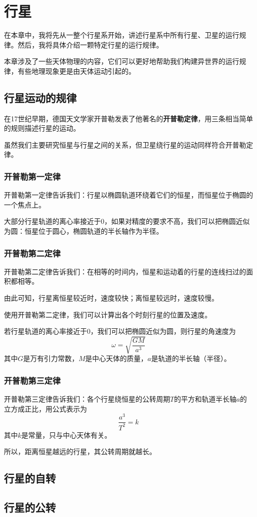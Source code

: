 \chapter{行星}
在本章中，我将先从一整个行星系开始，讲述行星系中所有行星、卫星的运行规律。然后，我将具体介绍一颗特定行星的运行规律。

本章涉及了一些天体物理的内容，它们可以更好地帮助我们构建异世界的运行规律，有些地理现象更是由天体运动引起的。

\section{行星运动的规律}
在17世纪早期，德国天文学家开普勒发表了他著名的\textbf{开普勒定律}，用三条相当简单的规则描述行星的运动。

虽然我们主要研究恒星与行星之间的关系，但卫星绕行星的运动同样符合开普勒定律。

\subsection{开普勒第一定律}
开普勒第一定律告诉我们：行星以椭圆轨道环绕着它们的恒星，而恒星位于椭圆的一个焦点上。

大部分行星轨道的离心率接近于0，如果对精度的要求不高，我们可以把椭圆近似为圆：恒星位于圆心，椭圆轨道的半长轴作为半径。

\subsection{开普勒第二定律}
开普勒第二定律告诉我们：在相等的时间内，恒星和运动着的行星的连线扫过的面积都相等。

由此可知，行星离恒星较近时，速度较快；离恒星较远时，速度较慢。

使用开普勒第二定律，我们可以计算出各个时刻行星的位置及速度。

若行星轨道的离心率接近于0，我们可以把椭圆近似为圆，则行星的角速度为\[\omega=\sqrt{\frac{GM}{a^3}}\]其中$G$是万有引力常数，$M$是中心天体的质量，$a$是轨道的半长轴（半径）。

\subsection{开普勒第三定律}
开普勒第三定律告诉我们：各个行星绕恒星的公转周期$T$的平方和轨道半长轴$a$的立方成正比，用公式表示为\[\frac{a^3}{T^2}=k\]其中$k$是常量，只与中心天体有关。

所以，距离恒星越远的行星，其公转周期就越长。

\section{行星的自转}

\section{行星的公转}
